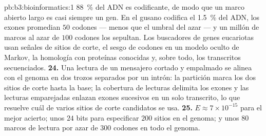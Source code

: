 \begin{solution}{pb:b3:bioinformatics:1}
\qty{88}{\%} del ADN es codificante, de modo que un marco abierto largo
es casi siempre un gen. En el gusano codifica el \qty{1.5}{\%} del ADN,
los exones promedian $50$ codones --- menos que el umbral del azar --- y
un millón de marcos al azar de $100$ codones los sepultan. Los buscadores
de genes eucariotas usan señales de sitios de corte, el sesgo de codones
en un modelo oculto de Markov, la homología con proteínas conocidas y,
sobre todo, los transcritos secuenciados.
\textbf{24.} Una lectura de un mensajero cortado y empalmado se alinea
con el genoma en dos trozos separados por un intrón: la partición marca
los dos sitios de corte hasta la base; la cobertura de lecturas delimita
los exones y las lecturas emparejadas enlazan exones sucesivos en un solo
transcrito, lo que resuelve cuál de varios sitios de corte candidatos se
usa.
\textbf{25.} $E \approx 7\times 10^{-15}$ para el mejor acierto; unos
$24$ bits para especificar $200$ sitios en el genoma; y unos $80$ marcos
de lectura por azar de $300$ codones en todo el genoma.
\end{solution}
